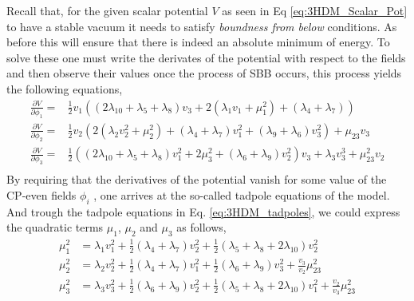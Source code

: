 Recall that, for the given scalar potential $V$ as seen in Eq \ref{eq:3HDM_Scalar_Pot} to have a stable vacuum it needs to satisfy \textit{boundness from below} conditions. 
%
As before this will ensure that there is indeed an absolute minimum of energy. 
%
To solve these one must write the derivates of the potential with respect to the fields and then observe their values once the process of SBB occurs, this process yields the following equations,
%
\begin{equation}
\label{eq:3HDM_tadpoles}
\begin{split}
\frac{\partial V}{\partial \phi_1} = & \frac{1}{2} v_1 \left( \left( 2 \lambda_{10} + \lambda_5 + \lambda_8 \right) v_3 + 2 \left( \lambda_1 v_1 + \mu_1^2 \right) + \left( \lambda_4 + \lambda_7 \right)  \right)  \\ 
\frac{\partial V}{\partial \phi_2} = & \frac{1}{2} v_2 \left( 2\left( \lambda_2 v_2^2 + \mu_2^2 \right) + \left( \lambda_4 + \lambda_7 \right) v_1^2 + \left( \lambda_9 + \lambda_6 \right)v_3^2 \right) + \mu_{23} v_3 \\
\frac{\partial V}{\partial \phi_3} = & \frac{1}{2} \left( \left( 2 \lambda_{10} + \lambda_5 + \lambda_8  \right) v_1^2  + 2 \mu_3^2 + \left( \lambda_6 + \lambda_9 \right) v_2^2 \right) v_3 + \lambda_3 v_3^3 + \mu_{23}^2 v_2 \\
\end{split} 
\end{equation}
%
By requiring that the derivatives of the potential vanish for some value of the CP-even fields $\phi_i$ , one arrives at the so-called tadpole equations of the model.
%
And trough the tadpole equations in Eq. \ref{eq:3HDM_tadpoles}, we could express the quadratic terms $\mu_1$, $\mu_2$ and $\mu_3$ as follows, 
%
\begin{equation}
\label{eq:3HDM_Param_1}
\begin{split}
\mu_1^2 & = \lambda_1 v_1^2 + \frac{1}{2} \left( \lambda_4 + \lambda_7 \right) v^2_2 + \frac{1}{2} \left( \lambda_5 + \lambda_8 + 2 \lambda_{10} \right) v_2^2  \\ 
\mu_2^2 & = \lambda_2 v_2^2 + \frac{1}{2} \left( \lambda_4 + \lambda_7 \right) v_1^2 + \frac{1}{2} \left( \lambda_6 + \lambda_9 \right) v_3^2 +\frac{v_3}{v_2} \mu^2_{23}  \\
\mu_3^2 & = \lambda_3 v^2_3  + \frac{1}{2}\left( \lambda_6 + \lambda_9 \right) v^2_2 + \frac{1}{2} \left( \lambda_5 + \lambda_8 + 2 \lambda_{10} \right)v_1^2 + \frac{v_2}{v_3} \mu_{23}^2 
\end{split}  
\end{equation}

